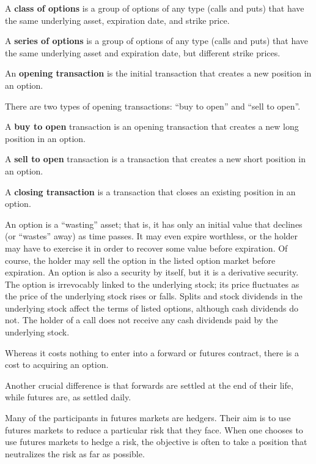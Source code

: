 A \textbf{class of options} is a group of options of any type (calls and puts) that have the same underlying asset,
expiration date, and strike price.
\ed

A \textbf{series of options} is a group of options of any type (calls and puts) that have the same underlying asset and
expiration date, but different strike prices.
\ed

An \textbf{opening transaction} is the initial transaction that creates a new position in an option.
\ed

There are two types of opening transactions: ``buy to open'' and ``sell to open''.

A \textbf{buy to open} transaction is an opening transaction that creates a new long position in an option.
\ed

A \textbf{sell to open} transaction is a transaction that creates a new short position in an option.
\ed


A \textbf{closing transaction} is a transaction that closes an existing position in an option.
\ed




An option is a ``wasting'' asset; that is, it has only an initial value that declines (or ``wastes'' away) as time
passes. It may even expire worthless, or the holder may have to exercise it in order to recover some value before
expiration. Of course, the holder may sell the option in the listed option market before expiration. An option is
also a security by itself, but it is a derivative security. The option is irrevocably linked to the underlying
stock; its price fluctuates as the price of the underlying stock rises or falls. Splits and stock dividends in the
underlying stock affect the terms of listed options, although cash dividends do not. The holder of a call does not
receive any cash dividends paid by the underlying stock.



Whereas it costs nothing to enter into a forward or futures contract, there is a cost to acquiring an option.

Another crucial difference is that forwards are settled at the end of their life, while futures are, as settled daily.

Many of the participants in futures markets are hedgers. Their aim is to use futures markets to reduce a particular
risk that they face. When one chooses to use futures markets to hedge a risk, the objective is often to take a
position that neutralizes the risk as far as possible.

